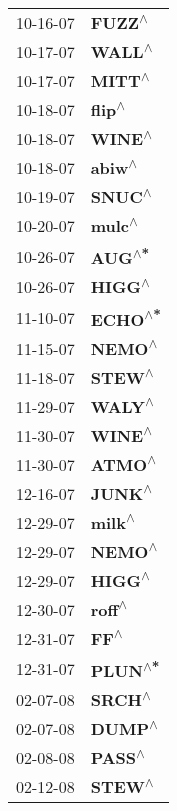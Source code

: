 \begin{supertabular}{p{0.08\textwidth}p{0.2\textwidth}}
 10-16-07 &    \textbf{FUZZ\textsuperscript{$\wedge$}} \\
 10-17-07 &    \textbf{WALL\textsuperscript{$\wedge$}} \\
 10-17-07 &    \textbf{MITT\textsuperscript{$\wedge$}} \\
 10-18-07 &    \textbf{flip\textsuperscript{$\wedge$}} \\
 10-18-07 &    \textbf{WINE\textsuperscript{$\wedge$}} \\
 10-18-07 &    \textbf{abiw\textsuperscript{$\wedge$}} \\
 10-19-07 &    \textbf{SNUC\textsuperscript{$\wedge$}} \\
 10-20-07 &    \textbf{mulc\textsuperscript{$\wedge$}} \\
 10-26-07 &    \textbf{AUG\textsuperscript{$\wedge$*}} \\
 10-26-07 &    \textbf{HIGG\textsuperscript{$\wedge$}} \\
 11-10-07 &   \textbf{ECHO\textsuperscript{$\wedge$*}} \\
 11-15-07 &    \textbf{NEMO\textsuperscript{$\wedge$}} \\
 11-18-07 &    \textbf{STEW\textsuperscript{$\wedge$}} \\
 11-29-07 &    \textbf{WALY\textsuperscript{$\wedge$}} \\
 11-30-07 &    \textbf{WINE\textsuperscript{$\wedge$}} \\
 11-30-07 &    \textbf{ATMO\textsuperscript{$\wedge$}} \\
 12-16-07 &    \textbf{JUNK\textsuperscript{$\wedge$}} \\
 12-29-07 &    \textbf{milk\textsuperscript{$\wedge$}} \\
 12-29-07 &    \textbf{NEMO\textsuperscript{$\wedge$}} \\
 12-29-07 &    \textbf{HIGG\textsuperscript{$\wedge$}} \\
 12-30-07 &    \textbf{roff\textsuperscript{$\wedge$}} \\
 12-31-07 &      \textbf{FF\textsuperscript{$\wedge$}} \\
 12-31-07 &   \textbf{PLUN\textsuperscript{$\wedge$*}} \\
 02-07-08 &    \textbf{SRCH\textsuperscript{$\wedge$}} \\
 02-07-08 &    \textbf{DUMP\textsuperscript{$\wedge$}} \\
 02-08-08 &    \textbf{PASS\textsuperscript{$\wedge$}} \\
 02-12-08 &    \textbf{STEW\textsuperscript{$\wedge$}} \\

\end{supertabular}

